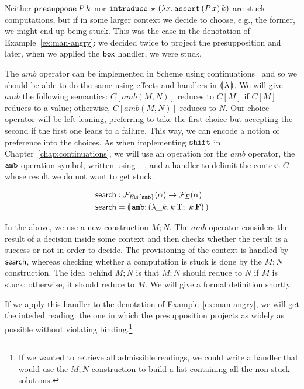 Neither $\mathtt{presuppose}\,P\,k$ nor
$\mathtt{introduce}\,\star\,(\lambda x.\, \mathtt{assert}\,(P\,x)\,k)$
are stuck computations, but if in some larger context we decide to choose,
e.g., the former, we might end up being stuck. This was the case in the
denotation of Example~\ref{ex:man-angry}: we decided twice to project the
presupposition and later, when we applied the $\textsf{box}$ handler, we were
stuck.

The $amb$ operator can be implemented in Scheme using
continuations~\cite{sitaram1998teach} and so we should be able to do the
same using effects and handlers in $\llparenthesis \, \lambda \, \rrparenthesis$. We will give $amb$
the following semantics: $C[amb(M, N)]$ reduces to $C[M]$ if $C[M]$ reduces
to a value; otherwise, $C[amb(M, N)]$ reduces to $N$. Our choice operator
will be left-leaning, preferring to take the first choice but accepting the
second if the first one leads to a failure. This way, we can encode a
notion of preference into the choices. As when implementing $\mathtt{shift}$ in
Chapter~\ref{chap:continuations}, we will use an operation for the $amb$
operator, the $\mathtt{amb}$ operation symbol, written using $+$, and a handler
to delimit the context $C$ whose result we do not want to get stuck.

\begin{align*}
  \search &: \FF_{E \uplus \{\op{amb}\}}(\alpha) \to \FF_E(\alpha) \\
  \search &= \banana{\onto{\op{amb}}{(\lam{\_ k}{\ap{k}{\true};\ \ap{k}{\false}})}}
\end{align*}

In the above, we use a new construction $M; N$. The $amb$ operator
considers the result of a decision inside some context and then checks
whether the result is a success or not in order to decide. The provisioning
of the context is handled by $\textsf{search}$, whereas checking whether a
computation is stuck is done by the $M; N$ construction. The idea behind
$M; N$ is that $M; N$ should reduce to $N$ if $M$ is stuck; otherwise, it
should reduce to $M$. We will give a formal definition shortly.

If we apply this handler to the denotation of Example~\ref{ex:man-angry},
we will get the inteded reading: the one in which the presupposition
projects as widely as possible without violating binding.\footnote{If we
  wanted to retrieve all admissible readings, we could write a handler that
  would use the $M; N$ construction to build a list containing all the
  non-stuck solutions.}

